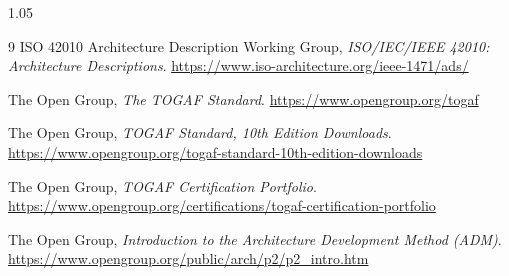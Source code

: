 \documentclass[11pt]{article}
\begin{document}
\begin{spacing}{1.05}
\begin{thebibliography}{9}
ISO 42010 Architecture Description Working Group,
\emph{ISO/IEC/IEEE 42010: Architecture Descriptions}.
\newline\url{https://www.iso-architecture.org/ieee-1471/ads/}

The Open Group,
\emph{The TOGAF Standard}.
\newline\url{https://www.opengroup.org/togaf}

The Open Group,
\emph{TOGAF Standard, 10th Edition Downloads}.
\newline\url{https://www.opengroup.org/togaf-standard-10th-edition-downloads}

The Open Group,
\emph{TOGAF Certification Portfolio}.
\newline\url{https://www.opengroup.org/certifications/togaf-certification-portfolio}

The Open Group,
\emph{Introduction to the Architecture Development Method (ADM)}.
\newline\url{https://www.opengroup.org/public/arch/p2/p2_intro.htm}

\end{thebibliography}

\end{spacing}
\end{document}
